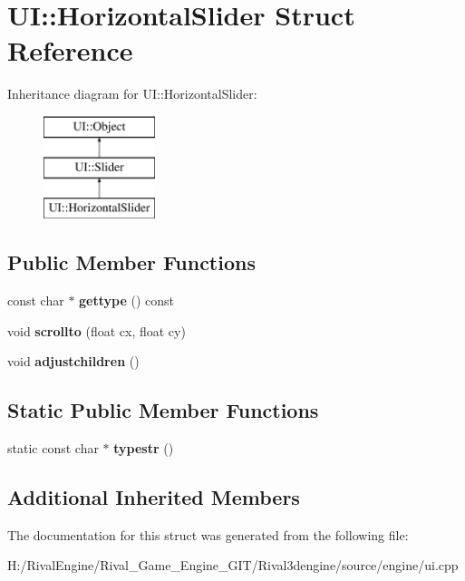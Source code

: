 \hypertarget{struct_u_i_1_1_horizontal_slider}{}\section{UI\+:\+:Horizontal\+Slider Struct Reference}
\label{struct_u_i_1_1_horizontal_slider}
Inheritance diagram for UI\+:\+:Horizontal\+Slider\+:\begin{figure}[H]
\begin{center}
\leavevmode
\includegraphics[height=3.000000cm]{struct_u_i_1_1_horizontal_slider}
\end{center}
\end{figure}
\subsection*{Public Member Functions}
\begin{DoxyCompactItemize}
\item 
\mbox{\label{struct_u_i_1_1_horizontal_slider_af87c8724ef136e4f8569e1b5beac44eb}} 
const char $\ast$ {\bfseries gettype} () const
\item 
\mbox{\label{struct_u_i_1_1_horizontal_slider_acdf7ba34ff12cc1f0786e51f00e77a35}} 
void {\bfseries scrollto} (float cx, float cy)
\item 
\mbox{\label{struct_u_i_1_1_horizontal_slider_ab4b39bf682c1f025f4fde682decfd859}} 
void {\bfseries adjustchildren} ()
\end{DoxyCompactItemize}
\subsection*{Static Public Member Functions}
\begin{DoxyCompactItemize}
\item 
\mbox{\label{struct_u_i_1_1_horizontal_slider_a782b1a63b40e374106e60e56cb0a71e3}} 
static const char $\ast$ {\bfseries typestr} ()
\end{DoxyCompactItemize}
\subsection*{Additional Inherited Members}


The documentation for this struct was generated from the following file\+:\begin{DoxyCompactItemize}
\item 
H\+:/\+Rival\+Engine/\+Rival\+\_\+\+Game\+\_\+\+Engine\+\_\+\+G\+I\+T/\+Rival3dengine/source/engine/ui.\+cpp\end{DoxyCompactItemize}
